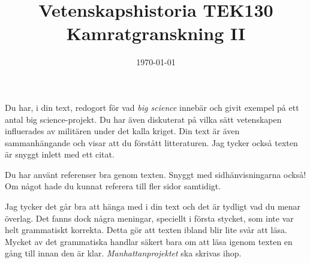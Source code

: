 \documentclass[a4paper, 11pt]{article}
\title{Vetenskapshistoria TEK130\\ Kamratgranskning II}
\author{}
\date{\today}
\begin{document}
\maketitle

Du har, i din text, redogort för vad \emph{big science} innebär och givit exempel på ett antal big science-projekt. Du har även diskuterat på vilka sätt vetenskapen influerades av militären under det kalla kriget. Din text är även sammanhängande och visar att du förstått litteraturen. Jag tycker också texten är snyggt inlett med ett citat.

Du har använt referenser bra genom texten. Snyggt med sidhänvisningarna också! Om något hade du kunnat referera till fler sidor samtidigt.

Jag tycker det går bra att hänga med i din text och det är tydligt vad du menar överlag. Det fanns dock några meningar, speciellt i första stycket, som inte var helt grammatiskt korrekta. Detta gör att texten ibland blir lite svår att läsa. Mycket av det grammatiska handlar säkert bara om att läsa igenom texten en gång till innan den är klar. \emph{Manhattanprojektet} ska skrivas ihop.
\end{document}
